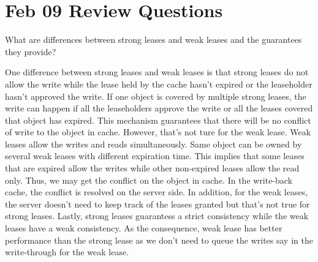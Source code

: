 \section{Feb 09 Review Questions}
\begin{QandA}
   \item What are differences between strong leases and weak leases and the guarantees they provide?
         \begin{answered}
		 One difference between strong leases and weak leases is that strong leases do not allow the write while the lease held by the cache
		 hasn't expired or the leaseholder hasn't approved the write. If one object is covered by multiple strong leases, the write can happen
		 if all the leaseholders approve the write or all the leases covered that object has expired. This mechanism guarantees that there
		 will be no conflict of write to the object in cache. However, that's not ture for the weak lease. Weak leases allow the writes and reads
		 simultaneously. Same object can be owned by several weak leases with different expiration time. This implies that some leases
		 that are expired allow the writes while other non-expired leases allow the read only. Thus, we may get the conflict on the object in cache.
		 In the write-back cache, the conflict is resolved on the server side. In addition, for the weak leases,
		 the server doesn't need to keep track of the leases granted but that's not true for strong leases. Lastly, strong leases guarantess a strict
		 consistency while the weak leases have a weak consistency. As the consequence, weak lease has better performance than the strong lease
		 as we don't need to queue the writes say in the write-through for the weak lease.
         \end{answered}


\end{QandA}
